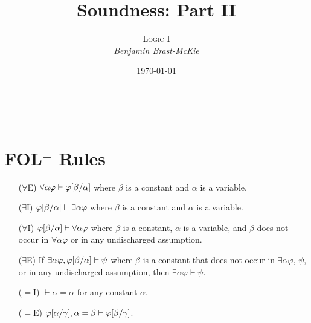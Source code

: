 \documentclass[a4paper, 11pt]{article} %
\title{\textbf{Soundness: Part II}} %
\author{\textsc{Logic I}\\ \em Benjamin Brast-McKie} %
\date{\today} %
\makeatletter
\renewcommand{\maketitle}{
\begin{flushright}
{\LARGE\@title}

\vspace{10pt}

{\@author}
\\ \@date
\end{flushright}

\vspace{-20pt}

}
\makeatother
\begin{document}
\maketitle %

\thispagestyle{empty}



%
   






\section*{FOL$^=$ Rules}

\begin{enumerate}
  \item[($\forall$E)] $\forall\alpha\varphi \vdash \varphi[\beta/\alpha]$ where $\beta$ is a constant and $\alpha$ is a variable. 
  \item[($\exists$I)] $\varphi[\beta/\alpha] \vdash \exists\alpha\varphi$ where $\beta$ is a constant and $\alpha$ is a variable.
  \item[($\forall$I)] $\varphi[\beta/\alpha] \vdash \forall\alpha\varphi$ where $\beta$ is a constant, $\alpha$ is a variable, and $\beta$ does not occur in $\forall\alpha\varphi$ or in any undischarged assumption.
  \item[($\exists$E)] If $\exists\alpha\varphi,\varphi[\beta/\alpha] \vdash \psi$ where $\beta$ is a constant that does not occur in $\exists\alpha\varphi$, $\psi$, or in any undischarged assumption, then $\exists\alpha\varphi\vdash \psi$.
  \item[($=$I)] $\vdash \alpha = \alpha$ for any constant $\alpha$. 
  \item[($=$E)] $\varphi[\alpha/\gamma],\alpha=\beta\vdash\varphi[\beta/\gamma]$.
\end{enumerate}
\end{document}
